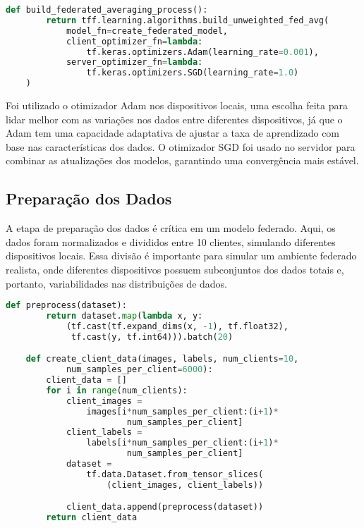\begin{lstlisting}[language=Python, caption={Construção do processo federado}, label={lst:build_federated_process}]
    def build_federated_averaging_process():
        return tff.learning.algorithms.build_unweighted_fed_avg(
            model_fn=create_federated_model,
            client_optimizer_fn=lambda: 
                tf.keras.optimizers.Adam(learning_rate=0.001),
            server_optimizer_fn=lambda: 
                tf.keras.optimizers.SGD(learning_rate=1.0)
    )
\end{lstlisting}

Foi utilizado o otimizador Adam nos dispositivos locais, uma escolha feita para lidar melhor com as variações nos dados entre diferentes dispositivos, já que o Adam tem uma capacidade adaptativa de ajustar a taxa de aprendizado com base nas características dos dados. O otimizador SGD foi usado no servidor para combinar as atualizações dos modelos, garantindo uma convergência mais estável.

\subsection{Preparação dos Dados}

A etapa de preparação dos dados é crítica em um modelo federado. Aqui, os dados foram normalizados e divididos entre 10 clientes, simulando diferentes dispositivos locais. Essa divisão é importante para simular um ambiente federado realista, onde diferentes dispositivos possuem subconjuntos dos dados totais e, portanto, variabilidades nas distribuições de dados.

\begin{lstlisting}[language=Python, caption={Preparação dos dados}, label={lst:data_preparation}]
    def preprocess(dataset):
        return dataset.map(lambda x, y: 
            (tf.cast(tf.expand_dims(x, -1), tf.float32), 
             tf.cast(y, tf.int64))).batch(20)

    def create_client_data(images, labels, num_clients=10, 
            num_samples_per_client=6000):
        client_data = []
        for i in range(num_clients):
            client_images = 
                images[i*num_samples_per_client:(i+1)*
                        num_samples_per_client]
            client_labels = 
                labels[i*num_samples_per_client:(i+1)*
                        num_samples_per_client]
            dataset = 
                tf.data.Dataset.from_tensor_slices(
                    (client_images, client_labels))

            client_data.append(preprocess(dataset))
        return client_data
\end{lstlisting}


